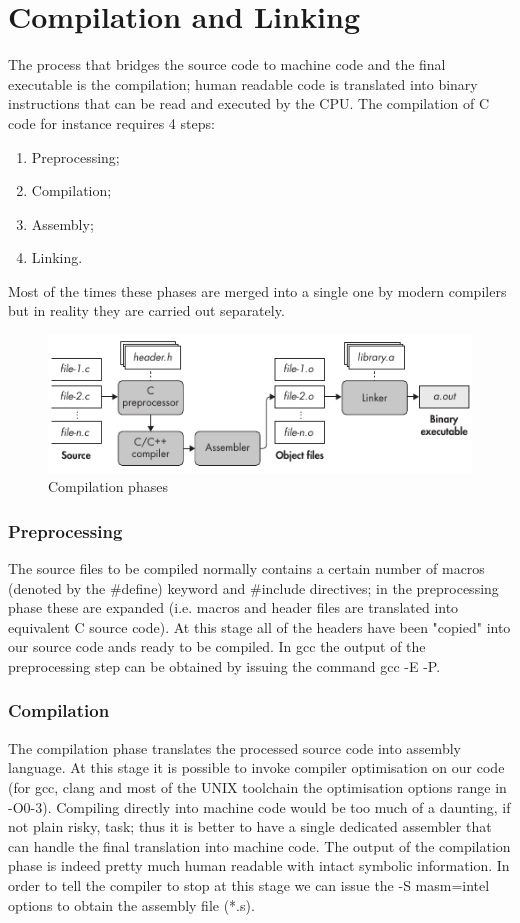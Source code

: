 \chapter{Compilation and Linking}
The process that bridges the source code to machine code and the final executable is the compilation; human readable
code is translated into binary instructions that can be read and executed by the CPU. The compilation of C code for
instance requires 4 steps:
\begin{enumerate}
    \item Preprocessing;
    \item Compilation;
    \item Assembly;
    \item Linking.
\end{enumerate}
Most of the times these phases are merged into a single one by modern compilers but in reality they are carried out
separately.
\begin{figure}[!htbp]
    \centering
    \includegraphics[scale=0.7]{./pics/compilation.png}
    \caption{Compilation phases}
    \label{comp}
\end{figure}

\subsection{Preprocessing}
The source files to be compiled normally contains a certain number of macros (denoted by the {\ttfamily \#define})
keyword and {\ttfamily \#include} directives; in the preprocessing phase these are expanded (i.e. macros and header
files are translated into equivalent C source code). At this stage all of the headers have been "copied" into our
source code ands ready to be compiled. In gcc the output of the preprocessing step can be obtained by issuing the
command {\ttfamily gcc -E -P}.

\subsection{Compilation}
The compilation phase translates the processed source code into assembly language. At this stage it is possible to
invoke compiler optimisation on our code (for gcc, clang and most of the UNIX toolchain the optimisation options
range in {\ttfamily -O0-3}). Compiling directly into machine code would be too much of a daunting, if not plain
risky, task; thus it is better to have a single dedicated assembler that can handle the final translation into
machine code. The output of the compilation phase is indeed pretty much human readable with intact symbolic
information. In order to tell the compiler to stop at this stage we can issue the {\ttfamily -S masm=intel} options to
obtain the assembly file (*.s).

